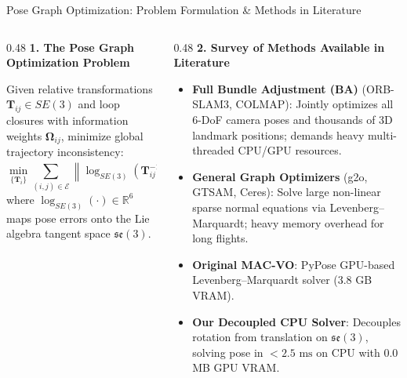 \documentclass[aspectratio=169, 10pt]{beamer}
\begin{document}
\begin{frame}{Pose Graph Optimization: Problem Formulation \& Methods in Literature}
  \begin{columns}[T]
    \begin{column}{0.48\textwidth}
      {\small \textbf{\textcolor{NavyBlue}{1. The Pose Graph Optimization Problem}}}
      \vspace{0.08cm}

      \scriptsize
      Given relative transformations $\mathbf{T}_{ij} \in SE(3)$ and loop closures with information weights $\mathbf{\Omega}_{ij}$, minimize global trajectory inconsistency:
      \begin{equation}
        \min_{\{\mathbf{T}_i\}} \sum_{(i,j) \in \mathcal{E}} \left\| \log_{SE(3)}\left( \mathbf{T}_{ij}^{-1} \mathbf{T}_i^{-1} \mathbf{T}_j \right) \right\|_{\mathbf{\Omega}_{ij}}^2
      \end{equation}
      where $\log_{SE(3)}(\cdot) \in \mathbb{R}^6$ maps pose errors onto the Lie algebra tangent space $\mathfrak{se}(3)$.
    \end{column}

    \begin{column}{0.48\textwidth}
      {\small \textbf{\textcolor{NavyBlue}{2. Survey of Methods Available in Literature}}}
      \vspace{0.08cm}
      \scriptsize
      \begin{itemize}
        \setlength{\itemsep}{2pt}
        \item \textbf{Full Bundle Adjustment (BA)} (ORB-SLAM3, COLMAP): Jointly optimizes all 6-DoF camera poses and thousands of 3D landmark positions; demands heavy multi-threaded CPU/GPU resources.
        \item \textbf{General Graph Optimizers} (g2o, GTSAM, Ceres): Solve large non-linear sparse normal equations via Levenberg--Marquardt; heavy memory overhead for long flights.
        \item \textbf{Original MAC-VO}: PyPose GPU-based Levenberg--Marquardt solver (3.8 GB VRAM).
        \item \textbf{Our Decoupled CPU Solver}: Decouples rotation from translation on $\mathfrak{se}(3)$, solving pose in $< 2.5\text{ ms}$ on CPU with 0.0 MB GPU VRAM.
      \end{itemize}
    \end{column}
  \end{columns}
\end{frame}
\end{document}
